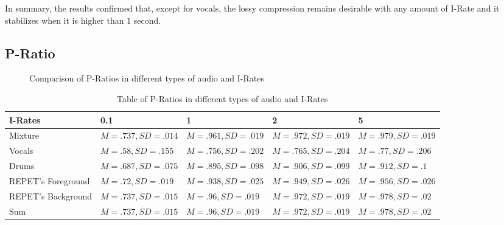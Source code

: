In summary, the results confirmed that, except for vocals, the lossy compression remains desirable with any amount of I-Rate and it stabilizes when it is higher than 1 second.

\subsection{P-Ratio}

\begin{figure}[ht]
  
  \caption{Comparison of P-Ratios in different types of audio and I-Rates}
  \label{fig:irate-pratio}
\end{figure}

\begin{table}[ht]
\centering
\begin{tabularx}{\linewidth}{|X|X|X|X|X|}
\hline
I-Rates & 0.1 & 1 & 2 & 5 \\
\hline
Mixture & $M=.737, SD=.014$ & $M=.961, SD=.019$ & $M=.972, SD=.019$ & $M=.979, SD=.019$ \\
\hline
Vocals & $M=.58, SD=.155$ & $M=.756, SD=.202$ & $M=.765, SD=.204$ & $M=.77, SD=.206$ \\
\hline
Drums & $M=.687, SD=.075$ & $M=.895, SD=.098$ & $M=.906, SD=.099$ & $M=.912, SD=.1$ \\
\hline
REPET's Foreground & $M=.72, SD=.019$ & $M=.938, SD=.025$ & $M=.949, SD=.026$ & $M=.956, SD=.026$  \\
\hline
REPET's Background & $M=.737, SD=.015$ & $M=.96, SD=.019$ & $M=.972, SD=.019$ & $M=.978, SD=.02$ \\
\hline
Sum & $M=.737, SD=.015$ & $M=.96, SD=.019$ & $M=.972, SD=.019$ & $M=.978, SD=.02$ \\
\hline
\end{tabularx}
\caption{Table of P-Ratios in different types of audio and I-Rates}
\label{tab:irate-pratio}
\end{table}

